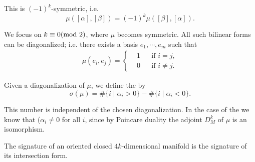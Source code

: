 This is $(-1)^k$-symmetric, i.e.
\[
  \mu([\alpha],[\beta]) = (-1)^k\mu([\beta],[\alpha]).
\]

We focus on $k\equiv 0 (\mathrm{mod}~ 2)$, where $\mu$ becomes symmetric. All such bilinear
forms can be diagonalized; i.e. there exists a basis $e_1,\cdots, e_m$ such that
\begin{align}\label{eq:13-10}
  \mu(e_i, e_j) = \left\{\begin{aligned}
    & 1 && \text{if } i=j,\\
    & 0 && \text{if } i\neq j.
  \end{aligned}\right.
\end{align}

Given a diagonalization of $\mu$, we define the  by
\[
  \sigma(\mu) = \#\{i\mid \alpha_i>0\} - \#\{i\mid \alpha_i<0\}.
\]

This number is independent of the chosen diagonalization. In the case of the
 we know that ($\alpha_i\neq 0$ for all $i$, since by Poincare duality the
adjoint $D_M^k$ of $\mu$ is an isomorphism.

\begin{definition}\label{definition:13-13}
  The signature of an oriented closed $4k$-dimensional manifold is the signature of its intersection form.
\end{definition}